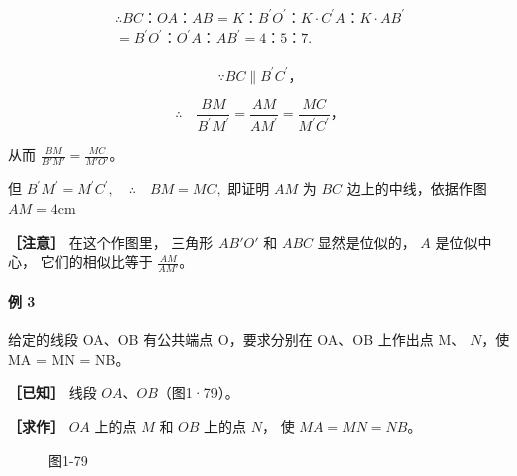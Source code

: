 \[
\begin{array}{l} \therefore B C\text{：} O A\text{：} A B = K\text{：} B ^ {\prime} O ^ {\prime}\text{：} K \cdot C ^ {\prime} A\text{：} K \cdot A B ^ {\prime} \\ = B ^ {\prime} O ^ {\prime}\text{：} O ^ {\prime} A\text{：} A B ^ {\prime} = 4\text{：} 5\text{：} 7. \\ \end{array}
\]

\[
\because B C \parallel B ^ {\prime} C ^ {\prime}\text{，}
\]

\[
\therefore \quad \frac {B M}{B ^ {\prime} M ^ {\prime}} = \frac {A M}{A M ^ {\prime}} = \frac {M C}{M ^ {\prime} C ^ {\prime}}\text{，}
\]

从而 \(\frac{BM}{B'M'} = \frac{MC}{M'O'}\)。

但
\(B^{\prime}M^{\prime} = M^{\prime}C^{\prime},\quad \therefore \quad BM = MC,\)
即证明 \(AM\) 为 \(BC\) 边上的中线，依据作图 \(AM = 4\mathrm{cm}\)

\textbf{［注意］} 在这个作图里， 三角形 \(AB'O'\) 和 \(ABC\)
显然是位似的， \(A\) 是位似中心， 它们的相似比等于 \(\frac{AM}{AM'}\)。

\paragraph{例 3}

给定的线段 OA、OB 有公共端点 O，要求分别在 OA、OB 上作出点 M、 \(N\)，使
MA = MN = NB。

\textbf{［已知］} 线段 \(OA\)、\(OB\)（图1·79）。

\textbf{［求作］} \(OA\) 上的点 \(M\) 和 \(OB\) 上的点 \(N\)， 使
\(MA = MN = NB\)。

\begin{figure}
\centering
{}
\caption{图1-79}
\end{figure}

